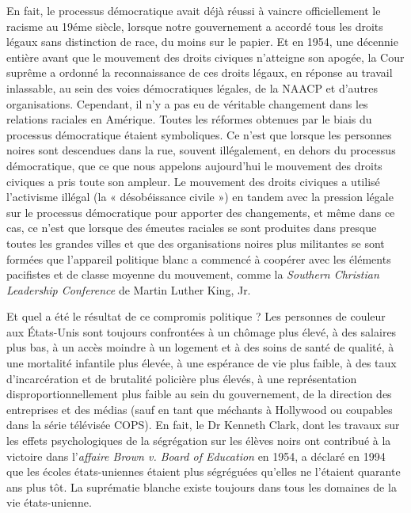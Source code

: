 En fait, le processus démocratique avait déjà réussi à vaincre officiellement le racisme au 19éme siècle, lorsque notre gouvernement a accordé tous les droits légaux sans distinction de race, du moins sur le papier. Et en 1954, une décennie entière avant que le mouvement des droits civiques n'atteigne son apogée, la Cour suprême a ordonné la reconnaissance de ces droits légaux, en réponse au travail inlassable, au sein des voies démocratiques légales, de la NAACP et d'autres organisations. Cependant, il n'y a pas eu de véritable changement dans les relations raciales en Amérique. Toutes les réformes obtenues par le biais du processus démocratique étaient symboliques. Ce n'est que lorsque les personnes noires sont descendues dans la rue, souvent illégalement, en dehors du processus démocratique, que ce que nous appelons aujourd'hui le mouvement des droits civiques a pris toute son ampleur. Le mouvement des droits civiques a utilisé l'activisme illégal (la « désobéissance civile ») en tandem avec la pression légale sur le processus démocratique pour apporter des changements, et même dans ce cas, ce n'est que lorsque des émeutes raciales se sont produites dans presque toutes les grandes villes et que des organisations noires plus militantes se sont formées que l'appareil politique blanc a commencé à coopérer avec les éléments pacifistes et de classe moyenne du mouvement, comme la \emph{Southern Christian Leadership Conference} de Martin Luther King, Jr.

Et quel a été le résultat de ce compromis politique ? Les personnes de couleur aux États-Unis sont toujours confrontées à un chômage plus élevé, à des salaires plus bas, à un accès moindre à un logement et à des soins de santé de qualité, à une mortalité infantile plus élevée, à une espérance de vie plus faible, à des taux d'incarcération et de brutalité policière plus élevés, à une représentation disproportionnellement plus faible au sein du gouvernement, de la direction des entreprises et des médias (sauf en tant que méchants à Hollywood ou coupables dans la série télévisée COPS). En fait, le Dr Kenneth Clark, dont les travaux sur les effets psychologiques de la ségrégation sur les élèves noirs ont contribué à la victoire dans l'\emph{affaire Brown v. Board of Education} en 1954, a déclaré en 1994 que les écoles états-uniennes étaient plus ségréguées qu'elles ne l'étaient quarante ans plus tôt. La suprématie blanche existe toujours dans tous les domaines de la vie états-unienne.


